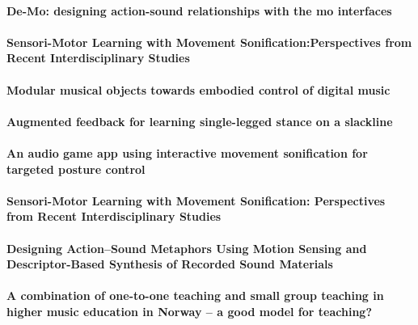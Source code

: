 \documentclass[11pt]{article}
\begin{document}
\paragraph{De-Mo: designing action-sound relationships with the mo interfaces} \citep{bevilacqua_-mo_2013}


\paragraph{Sensori-Motor Learning with Movement Sonification:Perspectives from Recent Interdisciplinary Studies} \citep{bevilacqua_sensori-motor_2016}


\paragraph{Modular musical objects towards embodied control of digital music} \citep{rasamimanana_modular_2011}


\paragraph{Augmented feedback for learning single-legged stance on a slackline} \citep{anlauff_augmented_2013}


\paragraph{An audio game app using interactive movement sonification for targeted posture control} \citep{avissar_audio_2013}


\paragraph{Sensori-Motor Learning with Movement Sonification: Perspectives from Recent Interdisciplinary Studies} \citep{bevilacqua_sensori-motor_2016}


\paragraph{Designing Action–Sound Metaphors Using Motion Sensing and Descriptor-Based Synthesis of Recorded Sound Materials} \citep{francoise_designing_2017}


\paragraph{A combination of one-to-one teaching and small group teaching in higher music education in Norway – a good model for teaching?} \citep{bjontegaard_combination_2015}
\end{document}
